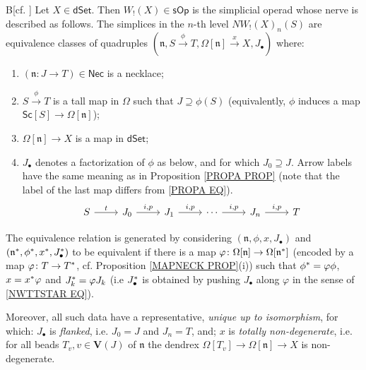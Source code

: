 \documentclass[a4paper,10pt
,draft
]{article}%
\numberwithin{equation}{section}
\numberwithin{figure}{section}
\theoremstyle{definition} %
\newcommand{\sOp}{\ensuremath{\mathsf{sOp}}}%
\newcommand{\1}{\ensuremath{\mathbbm 1}}%
\begin{document}
\begin{customthm}{B}[{cf. \cite[Thm. 1.3 and Cor. 4.4]{DS11}}]
	\label{THMB}
	Let $X\in \mathsf{dSet}$.
%
	Then $W_!(X) \in \sOp$ is the simplicial operad whose 
	nerve is described as follows.
%	
	The simplices in the $n$-th level
	$NW_!(X)_{n}(S)$
	are equivalence classes of quadruples
	$(\mathfrak{n}, S \xrightarrow{\phi} T, \Omega[\mathfrak{n}] \xrightarrow{x} X, J_{\bullet})$ 
	where:
\begin{enumerate}[label=(\roman*)]
	\item $(\mathfrak{n}\colon J \to T) \in \mathsf{Nec}$ is a necklace; 
	\item $S \xrightarrow{\phi} T$
		is a tall map in $\Omega$
		such that $J \supseteq \phi(S)$
		(equivalently, $\phi$ induces a map
		$\mathsf{Sc}[S] \to \Omega[\mathfrak{n}]$);		
	\item $\Omega[ \mathfrak{n}] \to X$ is a map in $\mathsf{dSet}$;
	\item $J_{\bullet}$ denotes a 
		factorization of $\phi$ as below,
		and for which $J_0 \supseteq J$.
		Arrow labels have the same meaning as in 
		Proposition \ref{PROPA PROP}
		(note that the label of the last map differs from
		\eqref{PROPA EQ}).
\begin{equation}
\begin{tikzcd}
	S \ar{r}{t}
&
	J_0 \ar{r}{i,p}
&
	J_1 \ar{r}{i,p}
	&
\cdots
	\ar{r}{i,p}
&
	J_n \ar{r}{i,p}
&
	T
\end{tikzcd}
\end{equation}
\end{enumerate}
	The equivalence relation is generated by considering 
	$(\mathfrak{n},\phi,x,J_{\bullet})$ and
	$(\mathfrak{n}^{\**},\phi^{\**},x^{\**},J_{\bullet}^{\**})$
	to be equivalent if there is
	a map
	$\varphi \colon \Omega[\mathfrak{n}] \to \Omega[\mathfrak{n}^{\**}]$
	(encoded by a map $\varphi \colon T \to T^{\**}$,
	 cf. Proposition \ref{MAPNECK PROP}(i))
	such that
	$\phi^{\**} = \varphi \phi$,
	$x = x^{\**} \varphi $
	and
	$J^{\**}_k = \varphi J_k$
	(i.e $J^{\**}_{\bullet}$
	is obtained by pushing 
	$J_{\bullet}$ along $\varphi$
	in the sense of \eqref{NWTTSTAR EQ}).
	
	Moreover, all such data have a representative, 
	\emph{unique up to isomorphism},
	for which:
	$J_{\bullet}$ is \emph{flanked},
	i.e. $J_0=J$ and $J_n=T$,
	and;
	$x$ is \emph{totally non-degenerate},
	i.e. for all beads 
	$T_v, v \in \boldsymbol{V}(J)$ of 
	$\mathfrak{n}$
	the dendrex
	$\Omega[T_v] \to \Omega[\mathfrak{n}] \to X$
	is non-degenerate. 
\end{customthm}
\end{document}
